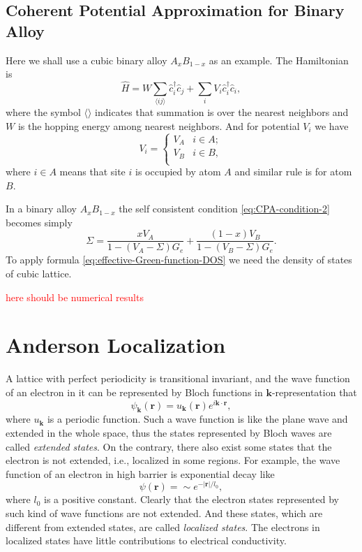 \documentclass{book}
\newcommand{\average}[1]{\langle#1\rangle}
\numberwithin{equation}{section}
\begin{document}
\subsection*{Coherent Potential Approximation for Binary Alloy}
Here we shall use a cubic binary alloy $A_xB_{1-x}$ as an example. The
Hamiltonian is 
\begin{equation}
  \hat{H}=W\!\!\sum_{\average{ij}}\hat{c}_i^\dagger\hat{c}_j+\sum_iV_i\hat{c}_i^\dagger\hat{c}_i,
\end{equation}
where the symbol $\average{}$ indicates that summation is over the
nearest neighbors and $W$ is the hopping energy among nearest
neighbors. And for potential $V_i$ we have
\begin{equation}
  V_i=\left\{\begin{array}{ll}
      V_A & i\in A;\\
      V_B & i\in B,\\
    \end{array}\right.
\end{equation}
where $i\in A$ means that site $i$ is occupied by atom $A$ and similar
rule is for atom $B$.

In a binary alloy $A_xB_{1-x}$ the self consistent condition
\eqref{eq:CPA-condition-2} becomes simply
\begin{equation}
  \Sigma=\frac{xV_A}{1-(V_A-\Sigma)G_e}+\frac{(1-x)V_B}{1-(V_B-\Sigma)G_e}.
\end{equation}
To apply formula \eqref{eq:effective-Green-function-DOS} we need the
density of states of cubic lattice. 

{\Huge \textcolor{red}{here should be numerical results}}


\section{Anderson Localization}
A lattice with perfect periodicity is transitional invariant, and the
wave function of an electron in it can be represented by Bloch
functions in $\bm{k}$-representation that
\begin{equation}
  \psi_{\bm{k}}(\bm{r})=u_{\bm{k}}(\bm{r})e^{i\bm{k}\cdot\bm{r}},
\end{equation}
where $u_{\bm{k}}$ is a periodic function. Such a wave function is
like the plane wave and extended in the whole space, thus the states
represented by Bloch waves are called \textit{extended states}. On the
contrary, there also exist some states that the electron is not
extended, i.e., localized in some regions. For example, the wave
function of an electron in high barrier is exponential decay like
\begin{equation}
  \psi(\bm{r})=\sim e^{-|\bm{r}|/l_0},
\end{equation}
where $l_0$ is a positive constant. Clearly that the electron states
represented by such kind of wave functions are not extended. And these
states, which are different from extended states, are called
\textit{localized states}. The electrons in localized states have
little contributions to electrical conductivity.
\end{document}
